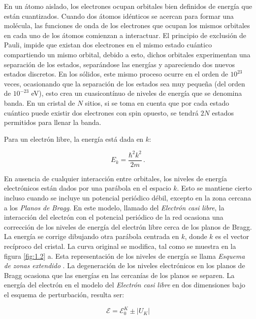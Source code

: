 En un átomo aislado, los electrones ocupan orbitales bien definidos de energía que están cuantizados. Cuando dos átomos idénticos se acercan para formar una molécula, las funciones de onda de los electrones que ocupan los mismos orbitales en cada uno de los átomos comienzan a interactuar. El principio de exclusión de Pauli, impide que existan dos electrones en el mismo estado cuántico compartiendo un mismo orbital, debido a esto, dichos orbitales experimentan una separación de los estados, separándose las energías y apareciendo dos nuevos estados discretos. En los sólidos, este mismo proceso ocurre en el orden de $10^{23}$ veces, ocasionando que la separación de los estados sea muy pequeña (del orden de $10^{-23}$ eV), esto crea un cuasicontínuo de niveles de energía que se denomina banda. En un cristal de $N$ sitios, si se toma en cuenta que por cada estado cuántico puede existir dos electrones con spin opuesto, se tendrá $2N$ estados permitidos para llenar la banda.

Para un electrón libre, la energía está dada en $k$:

\begin{equation}\label{eq:1.1}
    E_k=\frac{\hbar^2k^2}{2m}\,.
\end{equation}

En ausencia de cualquier interacción entre orbitales, los niveles de energía electrónicos están dados por una parábola en el espacio $k$. Esto se mantiene cierto incluso cuando se incluye un potencial periódico débil, excepto en la zona cercana a los \textit{Planos de Bragg}. En este modelo, llamado del \textit{Electrón casi libre}, la interacción del electrón con el potencial periódico de la red ocasiona una corrección de los niveles de energía del electrón libre cerca de los planos de Bragg. La energía se corrige dibujando otra parábola centrada en $k$, donde $k$ es el vector recíproco del cristal. La curva original se modifica, tal como se muestra en la figura \ref{fig:1.2} a. Esta representación de los niveles de energía se llama \textit{Esquema de zonas extendido} \cite{ashc}. La degeneración de los niveles electrónicos en los planos de Bragg ocasiona que las energías en las cercanías de los planos se separen. La energía del electrón en el modelo del \textit{Electrón casi libre} en dos dimensiones bajo el esquema de perturbación, resulta ser: 

\begin{equation}\label{eq:1.2}
    \mathcal{E}=\mathcal{E}^{K}_{0} \pm |U_K|
\end{equation}

